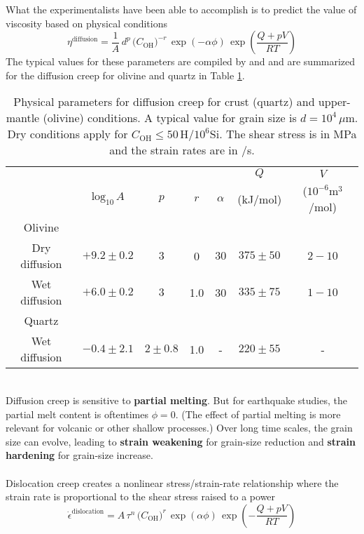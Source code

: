 \documentclass[letterpaper,12pt,]{memoir}
\begin{document}
What the experimentalists have been able to accomplish is to predict the value of viscosity based on physical conditions
\begin{equation}
\eta^\text{diffusion}=\frac{1}{A}\,d^{p}\,\big(C_\text{OH}\big)^{-r}\,\exp\left(-\alpha\phi\right)\,\exp\left(\frac{Q+pV}{RT}\right)
\end{equation}
The typical values for these parameters are compiled by \cite{hirth&kohlstedt03} and \cite{burgmann&dresen08} and are summarized for the diffusion creep for olivine and quartz in Table \ref{tbl:linear-viscosity}.\\ 
%
\begin{table}[t]
\centering
\def\arraystretch{1.5}
\begin{tabular*}{1\columnwidth}{ccccccc}
 &        &        &       &                & $Q$ & $V$ \\
 & $\text{log}_{10}\,A$ & $p$ & $r$ & $\alpha$ & (kJ/mol) & ($10^{-6}$m$^3$/mol) \\
\hline
Olivine \\
Dry diffusion & $+9.2\pm0.2$  & $3$ & 0 & $30$ & $375\pm50$ & $2-10$ \\
Wet diffusion & $+6.0\pm0.2$  & $3$ & 1.0 & 30 & $335\pm75$ & $1-10$ \\
Quartz \\
Wet diffusion & $-0.4\pm2.1$  & $2\pm0.8$ & 1.0 & - & $220\pm55$ & - \\
\end{tabular*}
\vspace{0.1cm}
\caption{Physical parameters for diffusion creep for crust (quartz) and upper-mantle (olivine) conditions. A typical value for grain size is $d=10^4\,\mu$m. Dry conditions apply for $C_\text{OH}\le50\,$H/$10^{6}$Si. The shear stress is in MPa and the strain rates are in /s.}
\label{tbl:linear-viscosity}
\end{table}
\\
Diffusion creep is sensitive to \textbf{partial melting}. But for earthquake studies, the partial melt content is oftentimes $\phi=0$. (The effect of partial melting is more relevant for volcanic or other shallow processes.) Over long time scales, the grain size can evolve, leading to \textbf{strain weakening} for grain-size reduction and \textbf{strain hardening} for grain-size increase.\\
\\
Dislocation creep creates a nonlinear stress/strain-rate relationship where the strain rate is proportional to the shear stress raised to a power
\begin{equation}
\dot{\epsilon}^\text{dislocation}=A\,\tau^n\,\big(C_\text{OH}\big)^r\,\exp\left(\alpha\phi\right)\,\exp\left(-\frac{Q+pV}{RT}\right)
\end{equation}
\end{document}
